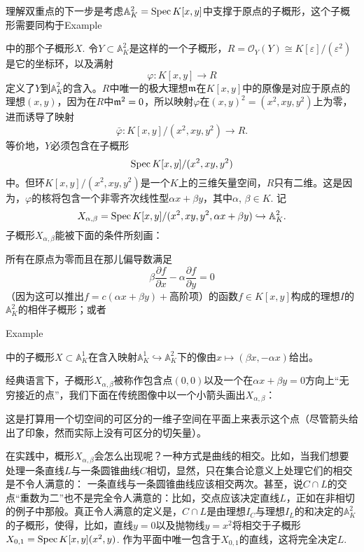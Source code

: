 \begin{exa}[双重点]
理解双重点的下一步是考虑$\mathbb{A}_K^2=\operatorname{Spec} K[x,y]$中支撑于原点的子概形，这个子概形需要同构于Example {{\addtocounter{thm}{-1}}\thethm{\addtocounter{thm}{1}}}中的那个子概形$X$. 令$Y\subset \mathbb{A}_K^2$是这样的一个子概形，$R=\mathscr{O}_Y(Y)\cong K[\varepsilon]/(\varepsilon^2)$是它的坐标环，以及满射
\[
	\varphi:K[x,y]\to R
\]
定义了$Y$到$\mathbb{A}_K^2$的含入。$R$中唯一的极大理想$\mathfrak{m}$在$K[x,y]$中的原像是对应于原点的理想$(x,y)$，因为在$R$中$\mathfrak{m}^2=0$，所以映射$\varphi$在$(x,y)^2=(x^2,xy,y^2)$上为零，进而诱导了映射
\[
	\bar\varphi:K[x,y]/(x^2,xy,y^2)\to R.
\]
等价地，$Y$必须包含在子概形
\[
	\operatorname{Spec} K[x,y]/(x^2,xy,y^2)
\]
中。但环$K[x,y]/(x^2,xy,y^2)$是一个$K$上的三维矢量空间，$R$只有二维。这是因为，$\varphi$的核将包含一个非零齐次线性型$\alpha x+\beta y$，其中$\alpha$, $\beta\in K$. 记
\[
	X_{\alpha,\beta}=\operatorname{Spec} K[x,y]/(x^2,xy,y^2,\alpha x+\beta y)\hookrightarrow \mathbb{A}_K^2.
\]
子概形$X_{\alpha,\beta}$能被下面的条件所刻画：

\begin{compactenum}[(i)]
\item 所有在原点为零而且在那儿偏导数满足
\[
	\beta\frac{\partial f}{\partial x}-\alpha\frac{\partial f}{\partial y}=0
\]
（因为这可以推出$f=c(\alpha x+\beta y)+\text{高阶项}$）的函数$f\in K[x,y]$构成的理想$I$的$\mathbb{A}^2_K$的相伴子概形；或者

\item Example {{\addtocounter{thm}{-1}}\thethm{\addtocounter{thm}{1}}}中的子概形$X\subset \mathbb{A}_K^1$在含入映射$\mathbb{A}_K^1\hookrightarrow\mathbb{A}_K^2$下的像由$x\mapsto (\beta x,-\alpha x)$给出。
\end{compactenum}

经典语言下，子概形$X_{\alpha,\beta}$被称作包含点$(0,0)$以及一个在$\alpha x+\beta y=0$方向上“无穷接近的点”，我们下面在传统图像中以一个小箭头画出$X_{\alpha,\beta}$：


\noindent 这是打算用一个切空间的可区分的一维子空间在平面上来表示这个点（尽管箭头给出了印象，然而实际上没有可区分的切矢量）。\nottran
\end{exa}

在实践中，概形$X_{\alpha,\beta}$会怎么出现呢？一种方式是曲线的相交。比如，当我们想要处理一条直线$L$与一条圆锥曲线$C$相切，显然，只在集合论意义上处理它们的相交是不令人满意的：
一条直线与一条圆锥曲线应该相交两次。甚至，说$C\cap L$的交点“重数为二”也不是完全令人满意的：比如，交点应该决定直线$L$，正如在非相切的例子中那般。真正令人满意的定义是，$C\cap L$是由理想$I_C$与理想$I_L$的和决定的$\mathbb{A}_K^2$的子概形，使得，比如，直线$y=0$以及抛物线$y=x^2$将相交于子概形$X_{0,1}=\operatorname{Spec} K[x,y](x^2,y)$. 作为平面中唯一包含于$X_{0,1}$的直线，这将完全决定$L$. 

